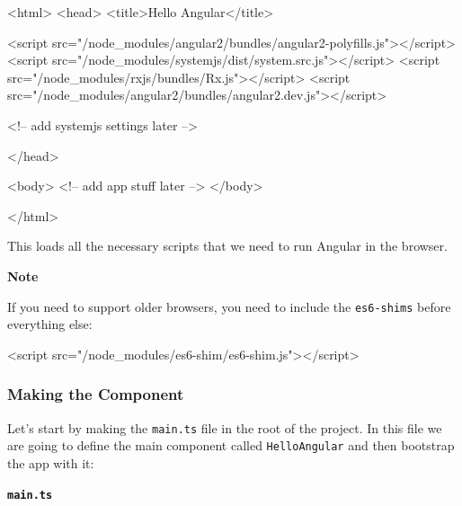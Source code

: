 \documentclass[12pt,]{article}
\newenvironment{Shaded}{}{}
\newcommand{\KeywordTok}[1]{\textcolor[rgb]{0.00,0.00,1.00}{{#1}}}
\newcommand{\StringTok}[1]{\textcolor[rgb]{0.00,0.50,0.50}{{#1}}}
\newcommand{\CommentTok}[1]{\textcolor[rgb]{0.00,0.50,0.00}{{#1}}}
\newcommand{\OtherTok}[1]{\textcolor[rgb]{1.00,0.25,0.00}{{#1}}}
\newcommand{\NormalTok}[1]{{#1}}
\begin{document}
\begin{Shaded}
\begin{Highlighting}[numbers=left,,]
\KeywordTok{<html>}
\KeywordTok{<head>}
  \KeywordTok{<title>}\NormalTok{Hello Angular}\KeywordTok{</title>}

  \KeywordTok{<script}\OtherTok{ src=}\StringTok{"/node_modules/angular2/bundles/angular2-polyfills.js"}\KeywordTok{></script>}
  \KeywordTok{<script}\OtherTok{ src=}\StringTok{"/node_modules/systemjs/dist/system.src.js"}\KeywordTok{></script>}
  \KeywordTok{<script}\OtherTok{ src=}\StringTok{"/node_modules/rxjs/bundles/Rx.js"}\KeywordTok{></script>}
  \KeywordTok{<script}\OtherTok{ src=}\StringTok{"/node_modules/angular2/bundles/angular2.dev.js"}\KeywordTok{></script>}

  \CommentTok{<!-- add systemjs settings later -->}

\KeywordTok{</head>}

\KeywordTok{<body>}
  \CommentTok{<!-- add app stuff later -->}
\KeywordTok{</body>}

\KeywordTok{</html>}
\end{Highlighting}
\end{Shaded}

This loads all the necessary scripts that we need to run Angular in the
browser.

\textbf{Note}

If you need to support older browsers, you need to include the
\texttt{es6-shims} before everything else:

\begin{Shaded}
\begin{Highlighting}[numbers=left,,]
\KeywordTok{<script}\OtherTok{ src=}\StringTok{"/node_modules/es6-shim/es6-shim.js"}\KeywordTok{></script>}
\end{Highlighting}
\end{Shaded}

\subsubsection{Making the Component}\label{making-the-component}

Let's start by making the \texttt{main.ts} file in the root of the
project. In this file we are going to define the main component called
\texttt{HelloAngular} and then bootstrap the app with it:

\textbf{\texttt{main.ts}}
\end{document}
